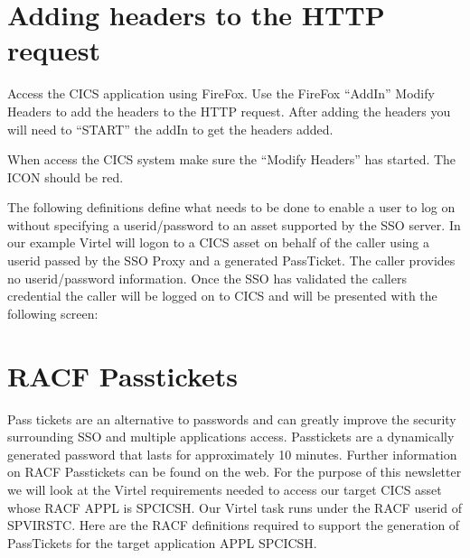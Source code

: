 \documentclass[letterpaper,10pt,english]{sphinxmanual}
\begin{document}
\section{Adding headers to the HTTP request}
\label{\detokenize{connectivity_guide:adding-headers-to-the-http-request}}\label{\detokenize{connectivity_guide:index-164}}
\sphinxAtStartPar
Access the CICS application using FireFox. Use the FireFox “AddIn” Modify Headers to add the headers to the HTTP request. After adding the headers you will need to “START” the addIn to get the headers added.

\sphinxAtStartPar
{} 

\sphinxAtStartPar
When access the CICS system make sure the “Modify Headers” has started. The ICON should be red.

\sphinxAtStartPar
{}

\sphinxAtStartPar
{}

\sphinxAtStartPar
The following definitions define what needs to be done to enable a user to log on without specifying a userid/password to an asset supported by the SSO server. In our example Virtel will logon to a CICS asset on behalf of the caller using a userid passed by the SSO Proxy and a generated PassTicket. The caller provides no userid/password information. Once the SSO has validated the callers credential the caller will be logged on to CICS and will be presented with the following screen:\sphinxhyphen{}

\sphinxAtStartPar
{} 

\newpage

\ignorespaces 

\section{RACF Passtickets}
\label{\detokenize{connectivity_guide:racf-passtickets}}\label{\detokenize{connectivity_guide:index-165}}
\sphinxAtStartPar
Pass tickets are an alternative to passwords and can greatly improve the security surrounding SSO and multiple applications access. Passtickets are a dynamically generated password that lasts for approximately 10 minutes. Further information on RACF Passtickets can be found on the web. For the purpose of this newsletter we will look at the Virtel requirements needed to access our target CICS asset whose RACF APPL is SPCICSH. Our Virtel task runs under the RACF userid of SPVIRSTC. Here are the RACF definitions required to support the generation of PassTickets for the target application APPL SPCICSH.
\end{document}
